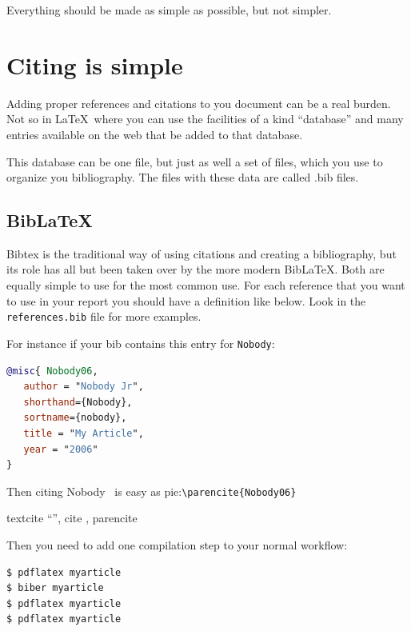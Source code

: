 \def\TheFile{ch08_citingsimple.tex}

\begin{savequote}[15cm]
  \vspace{-30mm}
  \raggedleft
\sffamily
Everything should be made as simple as possible, but not simpler.
\end{savequote}
\chapter{Citing is simple}

Adding proper references and citations to you document can be a real
burden.
Not so in \LaTeX\ where you can use the facilities of a kind ``database''
and many entries available on the web that be added to that database.

This database can be one file, but just as well a set of files, which
you use to organize you bibliography. The files with these data are
called .bib files. 

\section{Bib\LaTeX}
Bibtex is the traditional way of using citations and creating a bibliography, but its
role has all but been taken over by the more modern Bib\LaTeX.
Both are equally simple to use for the most common use. For each reference that you want to use in your report
you should have a definition like below. Look in the \texttt{references.bib} file for more examples.

For instance if your bib contains this entry for \texttt{Nobody}:
\begin{lstlisting}[language=BibTeX]
@misc{ Nobody06,
   author = "Nobody Jr",
   shorthand={Nobody},
   sortname={nobody},
   title = "My Article",
   year = "2006"
}
\end{lstlisting}
\lstset{language=BibTeX}
Then citing Nobody~\parencite{Nobody06} is easy as
pie:\lstinline|\parencite{Nobody06}|

textcite ``\textcite{Nobody06}'', cite \cite{Nobody06}, parencite \parencite{Nobody06}

Then you need to add one compilation step to your normal workflow:

\begin{lstlisting}[language=sh]
$ pdflatex myarticle
$ biber myarticle
$ pdflatex myarticle
$ pdflatex myarticle
\end{lstlisting}

